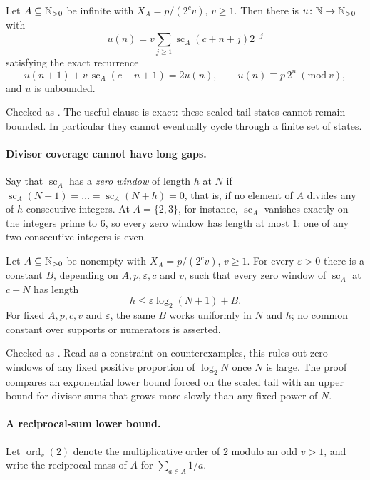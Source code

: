 \documentclass[11pt]{article}
\newcommand{\scA}{\operatorname{sc}}
\begin{document}
\begin{theorem}\label{res:unbounded}
Let $A\subseteq\mathbb{N}_{>0}$ be infinite with $X_A=p/(2^cv)$, $v\ge1$.  Then there is
$u\colon\mathbb{N}\to\mathbb{N}_{>0}$ with
\[
  u(n)=v\sum_{j\ge1}\scA_A(c+n+j)2^{-j}
\]
satisfying the exact recurrence
\[
  u(n+1)+v\,\scA_A(c+n+1)=2u(n),
  \qquad u(n)\equiv p\,2^{n}\ (\mathrm{mod}\ v),
\]
and $u$ is unbounded.
\end{theorem}

\noindent Checked as
.
The useful clause is exact: these scaled-tail states cannot remain bounded.
In particular they cannot eventually cycle through a finite set of states.

\paragraph{Divisor coverage cannot have long gaps.}
Say that $\scA_A$ has a \emph{zero window} of length $h$ at $N$ if
$\scA_A(N+1)=\dots=\scA_A(N+h)=0$, that is, if no element of $A$ divides any
of $h$ consecutive integers.  At $A=\{2,3\}$, for instance, $\scA_A$ vanishes
exactly on the integers prime to $6$, so every zero window has length at
most $1$: one of any two consecutive integers is even.

\begin{theorem}\label{res:sublog}
Let $A\subseteq\mathbb{N}_{>0}$ be nonempty with $X_A=p/(2^cv)$, $v\ge1$.  For every
$\varepsilon>0$ there is a constant $B$, depending on
$A,p,\varepsilon,c$ and $v$, such that every zero window of $\scA_A$ at
$c+N$ has length
\[
  h\le\varepsilon\log_2(N+1)+B .
\]
For fixed $A,p,c,v$ and $\varepsilon$, the same $B$ works uniformly in $N$
and $h$; no common constant over supports or numerators is asserted.
\end{theorem}

\noindent Checked as
.
Read as a constraint on counterexamples, this rules out zero windows of any
fixed positive proportion of $\log_2N$ once $N$ is large.  The proof compares
an exponential lower bound forced on the scaled tail with an upper bound for
divisor sums that grows more slowly than any fixed power of $N$.

\paragraph{A reciprocal-sum lower bound.}
Let $\operatorname{ord}_v(2)$ denote the multiplicative order of $2$ modulo an
odd $v>1$, and write the reciprocal mass of $A$ for $\sum_{a\in A}1/a$.
\end{document}
